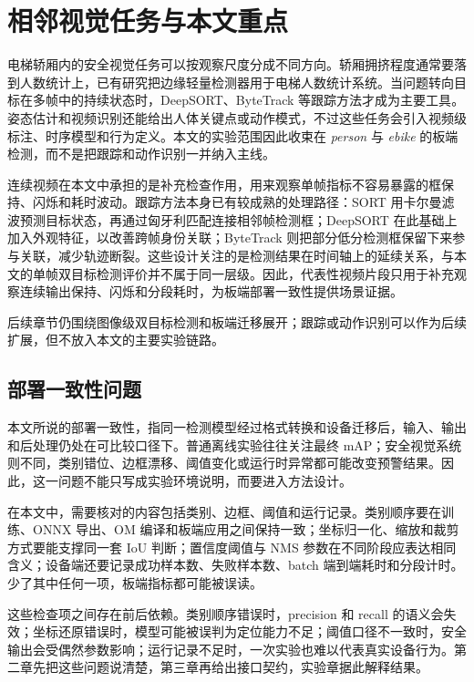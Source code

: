 \section{相邻视觉任务与本文重点}

电梯轿厢内的安全视觉任务可以按观察尺度分成不同方向。轿厢拥挤程度通常要落到人数统计上，已有研究把边缘轻量检测器用于电梯人数统计系统\cite{lin2023elevatorcounting}。当问题转向目标在多帧中的持续状态时，DeepSORT、ByteTrack 等跟踪方法才成为主要工具\cite{wojke2017deepsort,zhang2022bytetrack}。姿态估计和视频识别还能给出人体关键点或动作模式\cite{cao2017openpose,feichtenhofer2019slowfast}，不过这些任务会引入视频级标注、时序模型和行为定义。本文的实验范围因此收束在 \textit{person} 与 \textit{ebike} 的板端检测，而不是把跟踪和动作识别一并纳入主线。

连续视频在本文中承担的是补充检查作用，用来观察单帧指标不容易暴露的框保持、闪烁和耗时波动。跟踪方法本身已有较成熟的处理路径：SORT 用卡尔曼滤波预测目标状态，再通过匈牙利匹配连接相邻帧检测框\cite{bewley2016sort}；DeepSORT 在此基础上加入外观特征，以改善跨帧身份关联\cite{wojke2017deepsort}；ByteTrack 则把部分低分检测框保留下来参与关联，减少轨迹断裂\cite{zhang2022bytetrack}。这些设计关注的是检测结果在时间轴上的延续关系，与本文的单帧双目标检测评价并不属于同一层级。因此，代表性视频片段只用于补充观察连续输出保持、闪烁和分段耗时，为板端部署一致性提供场景证据。

后续章节仍围绕图像级双目标检测和板端迁移展开；跟踪或动作识别可以作为后续扩展，但不放入本文的主要实验链路。

\subsection{部署一致性问题}

本文所说的部署一致性，指同一检测模型经过格式转换和设备迁移后，输入、输出和后处理仍处在可比较口径下。普通离线实验往往关注最终 mAP；安全视觉系统则不同，类别错位、边框漂移、阈值变化或运行时异常都可能改变预警结果。因此，这一问题不能只写成实验环境说明，而要进入方法设计。

在本文中，需要核对的内容包括类别、边框、阈值和运行记录。类别顺序要在训练、ONNX 导出、OM 编译和板端应用之间保持一致；坐标归一化、缩放和裁剪方式要能支撑同一套 IoU 判断；置信度阈值与 NMS 参数在不同阶段应表达相同含义；设备端还要记录成功样本数、失败样本数、batch 端到端耗时和分段计时。少了其中任何一项，板端指标都可能被误读。

这些检查项之间存在前后依赖。类别顺序错误时，precision 和 recall 的语义会失效；坐标还原错误时，模型可能被误判为定位能力不足；阈值口径不一致时，安全输出会受偶然参数影响；运行记录不足时，一次实验也难以代表真实设备行为。第二章先把这些问题说清楚，第三章再给出接口契约，实验章据此解释结果。


